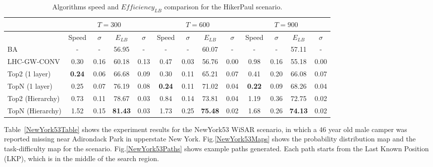 \begin{center}
\begin{table*}[hbtp]
{
\scriptsize
\hfill{}
\setlength{\extrarowheight}{1.5pt}
\begin{tabular}
{|l|c|c|c|c|c|c|c|c|c|c|c|c|}
\hline
& \multicolumn{4}{|c|}{$T=300$} & \multicolumn{4}{|c|}{$T=600$} & \multicolumn{4}{|c|}{$T=900$} \\ 
\hline
& Speed & $\sigma$ & $\mathit{E_{LB}}$ & $\sigma$ & Speed & $\sigma$ & $\mathit{E_{LB}}$ & $\sigma$ & Speed & $\sigma$ & $\mathit{E_{LB}}$ & $\sigma$\\ 
\hline
BA & - & - & 56.95 & - & - & - & 60.07 & - & - & - & 57.11 & - \\ 
\hline
LHC-GW-CONV & 0.30 & 0.16 & 60.18 & 0.13 & 0.47 & 0.03 & 56.76 & 0.00 & 0.98 & 0.16 & 55.18 & 0.00\\ 
\hline
Top2 (1 layer) & \textbf{0.24} & 0.06 & 66.68 & 0.09 & 0.30 & 0.11 & 65.21 & 0.07 & 0.41 & 0.20 & 66.08 & 0.07\\ 
\hline
TopN (1 layer) & 0.25 & 0.07 & 76.19 & 0.08 & \textbf{0.24} & 0.11 & 71.02 & 0.04 & \textbf{0.22} & 0.09 & 68.26 & 0.04\\ 
\hline
Top2 (Hierarchy) & 0.73 & 0.11 & 78.67 & 0.03 & 0.84 & 0.14 & 73.81 & 0.04 & 1.19 & 0.36 & 72.75 & 0.02\\ 
\hline
TopN (Hierarchy) & 1.52 & 0.15 & \textbf{81.43} & 0.03 & 1.73 & 0.25 & \textbf{75.48} & 0.02 & 1.68 & 0.26 & \textbf{74.13} & 0.02\\ 
\hline
\end{tabular}}
\medskip
\caption{Algorithms speed and $\mathit{Efficiency_{LB}}$ comparison for the HikerPaul scenario.}
\label{HikerPaulTable}
\vspace*{-2ex}
\end{table*}
\end{center}


Table~\ref{NewYork53Table} shows the experiment results for the NewYork53 WiSAR scenario, in which a 46 year old male camper was reported missing near Adirondack Park in upperstate New York. Fig.\ref{NewYork53Maps} shows the probability distribution map and the task-difficulty map for the scenario. Fig.\ref{NewYork53Paths} shows example paths generated. Each path starts from the Last Known Position (LKP), which is in the middle of the search region.


